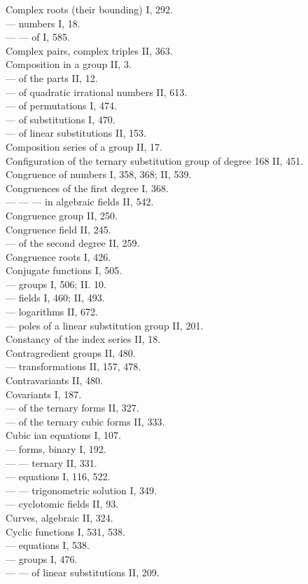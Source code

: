 Complex roots (their bounding) I, 292.\\
--- numbers I, 18.\\
--- --- of  I, 585.\\
Complex pairs, complex triples II, 363.\\
Composition in a group II, 3.\\
--- of the parts II, 12.\\
--- of quadratic irrational numbers II, 613.\\
--- of permutations I, 474.\\
--- of substitutions I, 470.\\
--- of linear substitutions II, 153.\\
Composition series of a group II, 17.\\
Configuration of the ternary substitution group of degree 168 II, 451.\\
Congruence of numbers I, 358, 368; II, 539.\\
Congruences of the first degree I, 368.\\
--- --- --- in algebraic fields II, 542.\\
Congruence group II, 250.\\
Congruence field II, 245.\\
--- of the second degree II, 259.\\
Congruence roots I, 426.\\
Conjugate functions I, 505.\\
--- groups I, 506; II. 10.\\ %
--- fields I, 460; II, 493.\\
--- logarithms II, 672.\\
--- poles of a linear substitution group II, 201.\\
Constancy of the index series II, 18.\\
Contragredient groups II, 480.\\
--- transformations II, 157, 478.\\
Contravariants II, 480.\\
Covariants I, 187.\\
--- of the ternary forms II, 327.\\
--- of the ternary cubic forms II, 333.\\
Cubic ian equations I, 107.\\
--- forms, binary I, 192.\\
--- --- ternary II, 331.\\
--- equations I, 116, 522.\\
--- --- trigonometric solution I, 349.\\
--- cyclotomic fields II, 93.\\
Curves, algebraic II, 324.\\
Cyclic functions I, 531, 538.\\
--- equations I, 538.\\
--- groups I, 476.\\
--- --- of linear substitutions II, 209.\\
